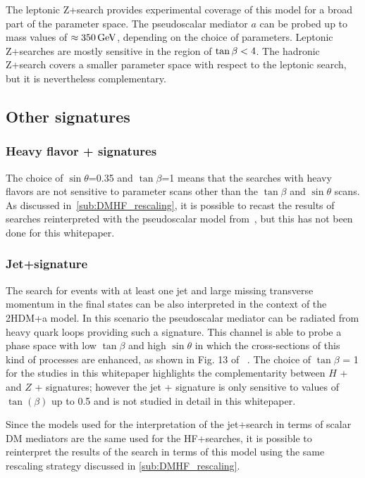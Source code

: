 The leptonic Z+\MET search provides experimental coverage of this model for a broad part of the parameter space. The pseudoscalar mediator $a$ can be probed up to mass values of $\approx\unit[350]{GeV}$, depending on the choice of parameters. Leptonic Z+\MET searches are mostly sensitive in the region of $\tan\beta<4$. The hadronic Z+\MET search covers a smaller parameter space with respect to the leptonic search, but it is nevertheless complementary.

\FloatBarrier

\subsection{Other signatures}

\subsubsection{Heavy flavor + \MET signatures}

The choice of $\sin\theta$=0.35 and $\tan\beta$=1 means that the searches with heavy flavors are not sensitive to parameter scans other than the $\tan\beta$ and $\sin\theta$ scans. As discussed in~\autoref{sub:DMHF_rescaling}, it is possible to recast the results of searches reinterpreted with the pseudoscalar model from~\cite{Abercrombie:2015wmb}, but this has not been done for this whitepaper. 

\subsubsection{Jet+\MET signature}

The search for events with at least one jet and large missing transverse momentum in the final states can be also interpreted in the context of the 2HDM+a model. In this scenario the pseudoscalar mediator can be radiated from heavy quark loops providing such a signature. This channel is able to probe a phase space with low $\tan\beta$ and high $\sin\theta$ in which the cross-sections of this kind of processes are enhanced, as shown in Fig. 13 of ~\cite{Bauer:2017ota}. The choice of $\tan\beta$ = 1 for the studies in this whitepaper highlights the complementarity between $H$ + \MET and $Z$ + \MET signatures; however the jet + \MET signature is only sensitive to values of $\tan(\beta)$ up to 0.5 and is not studied in detail in this whitepaper. 

Since the models used for the interpretation of the jet+\MET search in terms of scalar DM mediators are the same used for the HF+\MET searches, it is possible to reinterpret the results of the search in terms of this model using the same rescaling strategy discussed in \autoref{sub:DMHF_rescaling}. 

